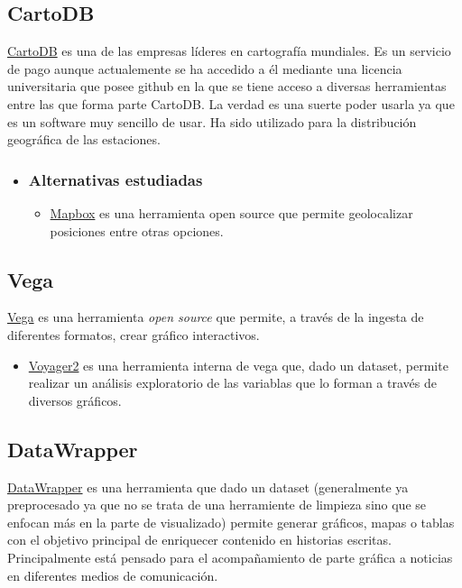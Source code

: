 \subsection{CartoDB}
\href{https://carto.com}{CartoDB} es una de las empresas líderes en cartografía mundiales. Es un servicio de pago aunque actualemente se ha accedido a él mediante una licencia universitaria que posee github en la que se tiene acceso a diversas herramientas entre las que forma parte CartoDB. La verdad es una suerte poder usarla ya que es un software muy sencillo de usar. Ha sido utilizado para la distribución geográfica de las estaciones.

\begin{itemize}
	\item \subsubsection{Alternativas estudiadas}
	\begin{itemize}
		\item \href{https://www.mapbox.com/}{Mapbox}  es una herramienta open source que permite geolocalizar posiciones entre otras opciones.
	\end{itemize}
\end{itemize}

\subsection{Vega}
\href{http://vega.github.io/}{Vega} es una herramienta \textit{open source} que permite, a través de la ingesta de diferentes formatos, crear gráfico interactivos. 

\begin{itemize}
		\item \href{http://vega.github.io/}{Voyager2} es una herramienta interna de vega que, dado un dataset, permite realizar un análisis exploratorio de las variablas que lo forman a través de diversos gráficos.
\end{itemize}

\subsection{DataWrapper}
\href{https://www.datawrapper.de}{DataWrapper} es una herramienta que dado un dataset (generalmente ya preprocesado ya que no se trata de una herramiente de limpieza sino que se enfocan más en la parte de visualizado) permite generar gráficos, mapas o tablas con el objetivo principal de enriquecer contenido en historias escritas. Principalmente está pensado para el acompañamiento de parte gráfica a noticias en diferentes medios de comunicación.


